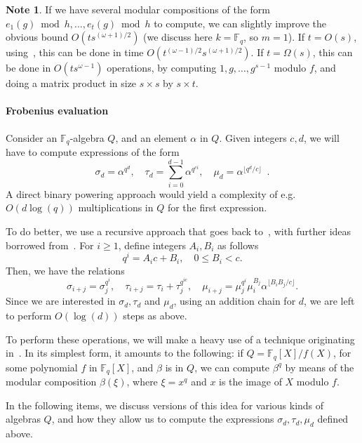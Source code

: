 \documentclass[12pt]{article}
\theoremstyle{plain}
\theoremstyle{definition}
\newtheorem{note}[theorem]{Note}
\def\F{\ensuremath{\mathbb{F}}}
\begin{document}
\begin{note}\label{note:multimc}
If we have several modular compositions of the form $e_1(g) \bmod
h,\dots,e_t(g) \bmod h$ to compute, we can slightly improve the obvious
bound $O(ts^{(\omega+1)/2})$ (we discuss here $k=\F_q$, so $m=1$). If
$t=O(s)$, using~\cite[Lemma~4]{kaltofen+shoup98}, this can be done in
time $O(t^{(\omega-1)/2}s^{(\omega+1)/2})$. If $t=\Omega(s)$, this can
be done in $O(t s^{\omega-1})$ operations, by computing $1,g,\dots,g^{s-1}$
modulo $f$, and doing a matrix product in size $s \times s$ by
$s \times t$.
\end{note}

\paragraph{Frobenius evaluation} Consider an $\F_q$-algebra $Q$,
and an element $\alpha$ in $Q$. Given integers $c,d$, we will have to
compute expressions of the form
\[
\sigma_d= \alpha^{q^d}, \quad \tau_d = \sum_{i=0}^{d-1} \alpha^{q^{ci}}, \quad
\mu_d=\alpha^{\lfloor q^d/c\rfloor} \enspace .
\]
A direct binary powering approach
would yield a complexity of e.g. $O(d\log(q))$ multiplications in $Q$
for the first expression.

To do better, we use a recursive approach that goes back
to~\cite{von1992computing}, with further ideas borrowed from~\cite{shoup94,kaltofen+shoup97}.
For $i \ge 1$, define integers $A_i, B_i$ as follows
\begin{equation*}
  q^i = A_ic + B_i, \quad 0\le B_i < c.
\end{equation*}
Then, we have the relations
$$\sigma_{i+j}=\sigma_j^{q^i}, \quad \tau_{i+j}=\tau_i +
\tau_j^{q^{ic}}, \quad \mu_{i+j}=\mu_j^{q^i}
\mu_i^{B_j}\alpha^{\lfloor B_iB_j / c \rfloor}.$$ Since we are
interested in $\sigma_d,\tau_d$ and $\mu_d$, using an addition chain
for $d$, we are left to perform $O(\log(d))$ steps as above.

To perform these operations, we will make a heavy use of a technique
originating in~\cite{von1992computing}. In its simplest form, it
amounts to the following: if $Q=\F_q[X]/f(X)$, for some polynomial $f$
in $\F_q[X]$, and $\beta$ is in $Q$, we can compute $\beta^{q}$ by
means of the modular composition $\beta(\xi)$, where $\xi = x^{q}$ and
$x$ is the image of $X$ modulo $f$.

In the following items, we discuss
versions of this idea for various kinds of algebras $Q$, and how they
allow us to compute the expressions $\sigma_d, \tau_d, \mu_d$ defined
above.
\end{document}
